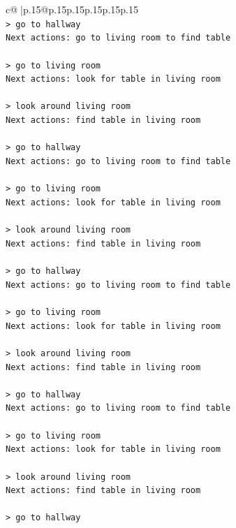 \documentclass{article}
\begin{document}
{\begin{supertabular}{c@{$\;$}|p{.15\linewidth}@{}p{.15\linewidth}p{.15\linewidth}p{.15\linewidth}p{.15\linewidth}p{.15\linewidth}}
{{{\\ 
\texttt{> go to hallway} \\
\texttt{Next actions: go to living room to find table} \\
\\ 
\texttt{> go to living room} \\
\texttt{Next actions: look for table in living room} \\
\\ 
\texttt{> look around living room} \\
\texttt{Next actions: find table in living room} \\
\\ 
\texttt{> go to hallway} \\
\texttt{Next actions: go to living room to find table} \\
\\ 
\texttt{> go to living room} \\
\texttt{Next actions: look for table in living room} \\
\\ 
\texttt{> look around living room} \\
\texttt{Next actions: find table in living room} \\
\\ 
\texttt{> go to hallway} \\
\texttt{Next actions: go to living room to find table} \\
\\ 
\texttt{> go to living room} \\
\texttt{Next actions: look for table in living room} \\
\\ 
\texttt{> look around living room} \\
\texttt{Next actions: find table in living room} \\
\\ 
\texttt{> go to hallway} \\
\texttt{Next actions: go to living room to find table} \\
\\ 
\texttt{> go to living room} \\
\texttt{Next actions: look for table in living room} \\
\\ 
\texttt{> look around living room} \\
\texttt{Next actions: find table in living room} \\
\\ 
\texttt{> go to hallway} \\
}}}
\end{supertabular}}
\end{document}
